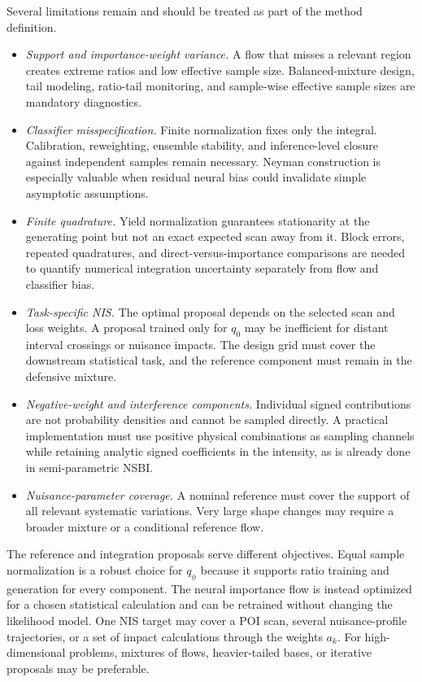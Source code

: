 \documentclass[
  aps,
  prd,
  superscriptaddress,
  nofootinbib,
  longbibliography,
  12pt
]{revtex4-2}
\newcommand{\qRef}{q_{\phi}}
\begin{document}
Several limitations remain and should be treated as part of the method definition.
\begin{itemize}
  \item \emph{Support and importance-weight variance.}  A flow that misses a relevant region creates extreme ratios and low effective sample size.  Balanced-mixture design, tail modeling, ratio-tail monitoring, and sample-wise effective sample sizes are mandatory diagnostics.
  \item \emph{Classifier misspecification.}  Finite normalization fixes only the integral.  Calibration, reweighting, ensemble stability, and inference-level closure against independent samples remain necessary.  Neyman construction is especially valuable when residual neural bias could invalidate simple asymptotic assumptions.
  \item \emph{Finite quadrature.}  Yield normalization guarantees stationarity at the generating point but not an exact expected scan away from it.  Block errors, repeated quadratures, and direct-versus-importance comparisons are needed to quantify numerical integration uncertainty separately from flow and classifier bias.
  \item \emph{Task-specific NIS.}  The optimal proposal depends on the selected scan and loss weights.  A proposal trained only for $q_0$ may be inefficient for distant interval crossings or nuisance impacts.  The design grid must cover the downstream statistical task, and the reference component must remain in the defensive mixture.
  \item \emph{Negative-weight and interference components.}  Individual signed contributions are not probability densities and cannot be sampled directly.  A practical implementation must use positive physical combinations as sampling channels while retaining analytic signed coefficients in the intensity, as is already done in semi-parametric NSBI.
  \item \emph{Nuisance-parameter coverage.}  A nominal reference must cover the support of all relevant systematic variations.  Very large shape changes may require a broader mixture or a conditional reference flow.
\end{itemize}

The reference and integration proposals serve different objectives.  Equal sample normalization is a robust choice for $\qRef$ because it supports ratio training and generation for every component.  The neural importance flow is instead optimized for a chosen statistical calculation and can be retrained without changing the likelihood model.  One NIS target may cover a POI scan, several nuisance-profile trajectories, or a set of impact calculations through the weights $a_k$.  For high-dimensional problems, mixtures of flows, heavier-tailed bases, or iterative proposals may be preferable.
\end{document}
